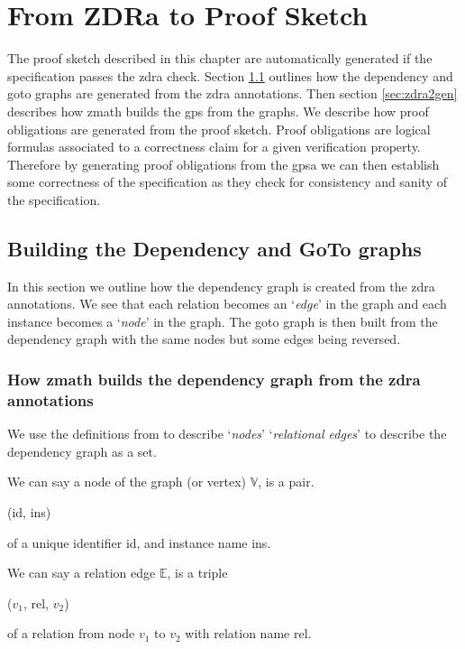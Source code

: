 \chapter{From ZDRa to Proof Sketch}
\label{ch:skeletons}

The proof sketch described in this chapter are automatically generated if the
specification passes the \gls{zdra} check. Section \ref{sec:buildinggraphs}
outlines how the dependency and goto graphs are generated from the \gls{zdra}
annotations. Then section \ref{sec:zdra2gen} describes how \gls{zmath} builds
the \gls{gps} from the graphs.  
We describe how proof obligations are generated from the  proof sketch.
Proof obligations are logical formulas associated to a correctness claim for a
given verification property. Therefore by generating proof obligations from 
the \gls{gpsa} we can then establish some correctness of the specification as
they check for consistency and sanity of the specification.


\section{Building the Dependency and GoTo graphs}
\label{sec:buildinggraphs}

In this section we outline how the dependency graph is created from the
\gls{zdra} annotations. We see that each relation becomes an `\emph{edge}' in
the graph and each instance becomes a `\emph{node}' in the graph. The goto graph
is then built from the dependency graph with the same nodes but some edges being
reversed.

\subsection{How \gls{zmath} builds the dependency graph from the \gls{zdra} annotations}

We use the definitions from \cite{zengfirstyear} to describe `\emph{nodes}'
`\emph{relational edges}' to describe the dependency graph as a set.

\begin{defin} We can say a node of the graph (or vertex) $\mathbb{V}$, is
a pair.
\begin{center}
(id, ins)
\end{center}
of a unique identifier id, and instance name ins. 
\end{defin} 

\begin{defin} We can say a relation edge $\mathbb{E}$, is a
triple
\begin{center}
($v_{1}$, rel, $v_{2}$)
\end{center}
of a relation from node $v_{1}$ to $v_{2}$ with relation name rel.
\end{defin} 

